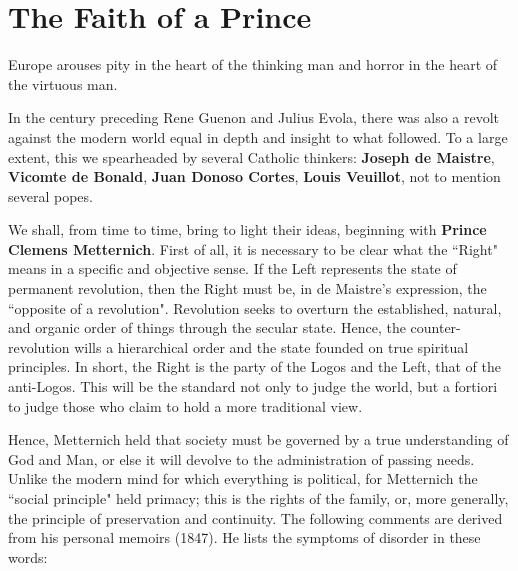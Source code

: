 \section{The Faith of a Prince}

\begin{quotex}
Europe arouses pity in the heart of the thinking man and horror in the heart of the virtuous man. 

\end{quotex}
In the century preceding Rene Guenon and Julius Evola, there was also a revolt against the modern world equal in depth and insight to what followed. To a large extent, this we spearheaded by several Catholic thinkers: \textbf{Joseph de Maistre}, \textbf{Vicomte de Bonald}, \textbf{Juan Donoso Cortes}, \textbf{Louis Veuillot}, not to mention several popes.

We shall, from time to time, bring to light their ideas, beginning with \textbf{Prince Clemens Metternich}. First of all, it is necessary to be clear what the ``Right" means in a specific and objective sense. If the Left represents the state of permanent revolution, then the Right must be, in de Maistre's expression, the ``opposite of a revolution". Revolution seeks to overturn the established, natural, and organic order of things through the secular state. Hence, the counter-revolution wills a hierarchical order and the state founded on true spiritual principles. In short, the Right is the party of the Logos and the Left, that of the anti-Logos. This will be the standard not only to judge the world, but a fortiori to judge those who claim to hold a more traditional view.

Hence, Metternich held that society must be governed by a true understanding of God and Man, or else it will devolve to the administration of passing needs. Unlike the modern mind for which everything is political, for Metternich the ``social principle" held primacy; this is the rights of the family, or, more generally, the principle of preservation and continuity. The following comments are derived from his personal memoirs (1847). He lists the symptoms of disorder in these words:

